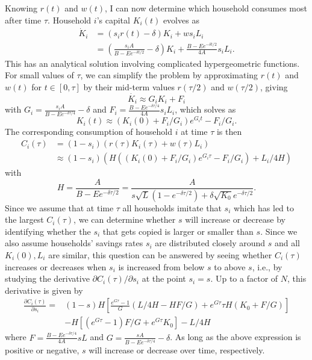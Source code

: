 Knowing $r(t)$ and $w(t)$, I can now determine which household consumes most after time $\tau$.
Household $i$'s capital $K_i(t)$ evolves as 
\begin{equation}
\begin{split}
    \dot K_i 
    &= (s_i r(t) - \delta) K_i + w s_i L_i \nonumber \\
    &= \left(\frac{s_i A}{B - E e^{-\delta t/2}} - \delta\right) K_i
        + \frac{B - E e^{-\delta t/2}}{4 A} s_i L_i.
\end{split}
\end{equation}
This has an analytical solution involving complicated hypergeometric functions.
For small values of $\tau$, we can simplify the problem by approximating $r(t)$ and $w(t)$ for $t\in[0,\tau]$ by their mid-term values $r(\tau/2)$ and $w(\tau/2)$, giving
\begin{equation*}
\dot{K_i} \approx G_i K_i + F_i
\end{equation*}
with $G_i = \frac{s_i A}{B - E e^{-\delta \tau/4}} - \delta$
and $F_i = \frac{B - E e^{-\delta \tau/4}}{4 A} s_i L_i$,
which solves as
\begin{equation*}
    K_i(t) \approx (K_i(0) + F_i/G_i)e^{G_i t} - F_i/G_i.
\end{equation*}
The corresponding consumption of household $i$ at time $\tau$ is then
\begin{align}
    C_i(\tau) 
    &= (1 - s_i)(r(\tau) K_i(\tau) + w(\tau) L_i) \nonumber \\
    &\approx (1 - s_i)\left( 
        H((K_i(0) + F_i/G_i)e^{G_i\tau} - F_i/G_i)
        + L_i/4 H
    \right)
\label{eq:Citau}
\end{align}
with 
\begin{equation}
        H = \frac{A}{B - E e^{-\delta\tau/2}} = \frac{A}{s\sqrt L (1 - e^{-\delta\tau/2}) + \delta \sqrt{K_0} e^{-\delta\tau/2}}.\nonumber
\end{equation}
Since we assume that at time $\tau$ all households imitate that $s_i$ which has led to the largest $C_i(\tau)$,
we can determine whether $s$ will increase or decrease by identifying whether the $s_i$ that gets copied is larger or smaller than $s$.
Since we also assume households' savings rates $s_i$ are distributed closely around $s$ and all $K_i(0), L_i$ are similar, this question can be answered by seeing whether $C_i(\tau)$ increases or decreases when $s_i$ is increased from below $s$ to above $s$, i.e., by studying the derivative $\partial C_i(\tau)/\partial s_i$ at the point $s_i = s$. Up to a factor of $N$, this derivative is given by
\begin{align}
  \frac{\partial C_i(\tau)}{\partial s_i} = &(1 - s) H\left[
        \frac{e^{G\tau} - 1}{G}(L / 4 H - H F/G) + e^{G\tau}\tau H (K_0 + F/G)\right] \nonumber \\
    &- H[(e^{G\tau} - 1) F/G + e^{G\tau} K_0] 
    - L / 4 H
    \label{sdotnew}
\end{align}
where $F = \frac{B - E e^{-\delta \tau/4}}{4 A} s L$ and
$G = \frac{s A}{B - E e^{-\delta \tau/4}} - \delta$.
As long as the above expression is positive or negative, $s$ will increase or decrease over time, respectively.

